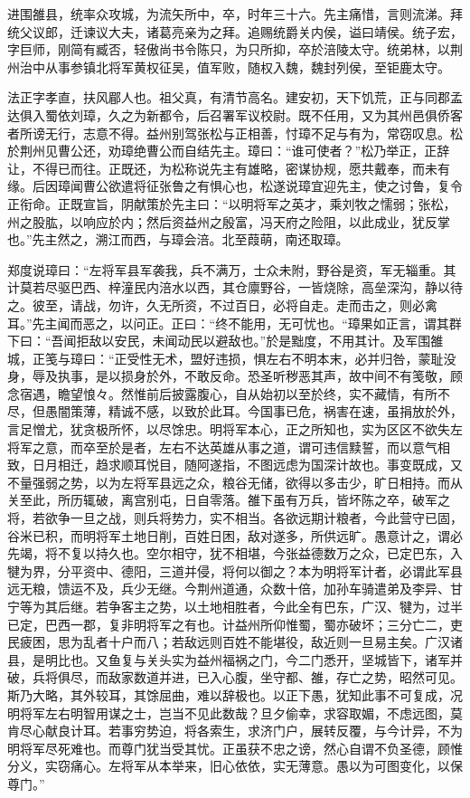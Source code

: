 \documentclass[12pt,UTF8]{ctexbook}
\begin{document}
进围雒县，统率众攻城，为流矢所中，卒，时年三十六。先主痛惜，言则流涕。拜统父议郎，迁谏议大夫，诸葛亮亲为之拜。追赐统爵关内侯，谥曰靖侯。统子宏，字巨师，刚简有臧否，轻傲尚书令陈只，为只所抑，卒於涪陵太守。统弟林，以荆州治中从事参镇北将军黄权征吴，值军败，随权入魏，魏封列侯，至钜鹿太守。

法正字孝直，扶风郿人也。祖父真，有清节高名。建安初，天下饥荒，正与同郡孟达俱入蜀依刘璋，久之为新都令，后召署军议校尉。既不任用，又为其州邑俱侨客者所谤无行，志意不得。益州别驾张松与正相善，忖璋不足与有为，常窃叹息。松於荆州见曹公还，劝璋绝曹公而自结先主。璋曰：“谁可使者？”松乃举正，正辞让，不得已而往。正既还，为松称说先主有雄略，密谋协规，愿共戴奉，而未有缘。后因璋闻曹公欲遣将征张鲁之有惧心也，松遂说璋宜迎先主，使之讨鲁，复令正衔命。正既宣旨，阴献策於先主曰：“以明将军之英才，乘刘牧之懦弱；张松，州之股肱，以响应於内；然后资益州之殷富，冯天府之险阻，以此成业，犹反掌也。”先主然之，溯江而西，与璋会涪。北至葭萌，南还取璋。

郑度说璋曰：“左将军县军袭我，兵不满万，士众未附，野谷是资，军无辎重。其计莫若尽驱巴西、梓潼民内涪水以西，其仓廪野谷，一皆烧除，高垒深沟，静以待之。彼至，请战，勿许，久无所资，不过百日，必将自走。走而击之，则必禽耳。”先主闻而恶之，以问正。正曰：“终不能用，无可忧也。“璋果如正言，谓其群下曰：“吾闻拒敌以安民，未闻动民以避敌也。”於是黜度，不用其计。及军围雒城，正笺与璋曰：“正受性无术，盟好违损，惧左右不明本末，必并归咎，蒙耻没身，辱及执事，是以损身於外，不敢反命。恐圣听秽恶其声，故中间不有笺敬，顾念宿遇，瞻望悢々。然惟前后披露腹心，自从始初以至於终，实不藏情，有所不尽，但愚闇策薄，精诚不感，以致於此耳。今国事已危，祸害在速，虽捐放於外，言足憎尤，犹贪极所怀，以尽馀忠。明将军本心，正之所知也，实为区区不欲失左将军之意，而卒至於是者，左右不达英雄从事之道，谓可违信黩誓，而以意气相致，日月相迁，趋求顺耳悦目，随阿遂指，不图远虑为国深计故也。事变既成，又不量强弱之势，以为左将军县远之众，粮谷无储，欲得以多击少，旷日相持。而从关至此，所历辄破，离宫别屯，日自零落。雒下虽有万兵，皆坏陈之卒，破军之将，若欲争一旦之战，则兵将势力，实不相当。各欲远期计粮者，今此营守已固，谷米已积，而明将军土地日削，百姓日困，敌对遂多，所供远旷。愚意计之，谓必先竭，将不复以持久也。空尔相守，犹不相堪，今张益德数万之众，已定巴东，入犍为界，分平资中、德阳，三道并侵，将何以御之？本为明将军计者，必谓此军县远无粮，馈运不及，兵少无继。今荆州道通，众数十倍，加孙车骑遣弟及李异、甘宁等为其后继。若争客主之势，以土地相胜者，今此全有巴东，广汉、犍为，过半已定，巴西一郡，复非明将军之有也。计益州所仰惟蜀，蜀亦破坏；三分亡二，吏民疲困，思为乱者十户而八；若敌远则百姓不能堪役，敌近则一旦易主矣。广汉诸县，是明比也。又鱼复与关头实为益州福祸之门，今二门悉开，坚城皆下，诸军并破，兵将俱尽，而敌家数道并进，已入心腹，坐守都、雒，存亡之势，昭然可见。斯乃大略，其外较耳，其馀屈曲，难以辞极也。以正下愚，犹知此事不可复成，况明将军左右明智用谋之士，岂当不见此数哉？旦夕偷幸，求容取媚，不虑远图，莫肯尽心献良计耳。若事穷势迫，将各索生，求济门户，展转反覆，与今计异，不为明将军尽死难也。而尊门犹当受其忧。正虽获不忠之谤，然心自谓不负圣德，顾惟分义，实窃痛心。左将军从本举来，旧心依依，实无薄意。愚以为可图变化，以保尊门。”
\end{document}

